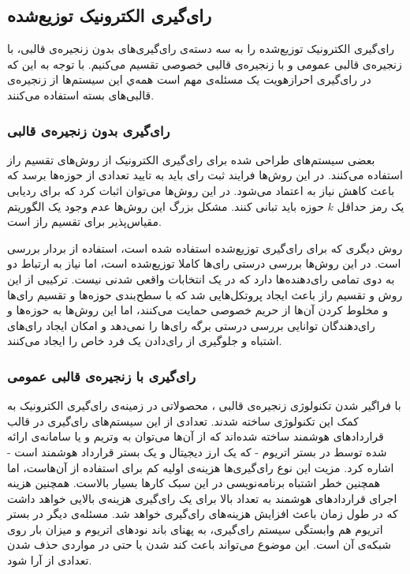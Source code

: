 \subsection{رای‌گیری الکترونیک توزیع‌شده}
رای‌گیری الکترونیک توزیع‌شده را به سه دسته‌ی رای‌گیری‌های بدون زنجیره‌ی قالبی، با زنجیره‌ی قالبی عمومی و با زنجیره‌ی قالبی خصوصی تقسیم می‌کنیم. با توجه به این که در رای‌گیری احرازهویت یک مسئله‌ی مهم است همه‌ي این سیستم‌ها از زنجیره‌ی قالبی‌های بسته استفاده می‌کنند.
\subsubsection{رای‌گیری بدون زنجیره‌ی قالبی} 
بعضی سیستم‌های طراحی شده برای رای‌گیری الکترونیک
\cite{secret1}
\cite{secret2}
\cite{secret3}
از روش‌های تقسیم راز
استفاده می‌کنند. در این روش‌ها فرایند ثبت رای باید به تایید تعدادی از حوزه‌ها برسد که باعث کاهش نیاز به اعتماد می‌شود. در این روش‌ها می‌توان اثبات کرد که برای ردیابی یک رمز حداقل $k$ حوزه باید تبانی کنند. مشکل بزرگ این روش‌ها عدم وجود یک الگوریتم مقیاس‌پذیر برای تقسیم راز است.
\par
روش دیگری که برای رای‌گیری توزیع‌شده استفاده شده است، استفاده از بردار‌ بررسی
\cite{checkvector}
است. در این روش‌ها بررسی درستی رای‌ها کاملا توزیع‌شده‌ است، اما نیاز به ارتباط دو به دوی تمامی رای‌دهنده‌ها دارد که در یک انتخابات واقعی شدنی نیست. ترکیبی از این روش و تقسیم راز باعث ایجاد پروتکل‌هایی
\cite{MPO1} \cite{evotinwocrypto}
شد که با سطح‌بندی حوزه‌ها و تقسیم رای‌ها و مخلوط کردن آن‌ها از حریم خصوصی حمایت می‌کنند، اما این روش‌ها به حوزه‌ها و رای‌دهندگان توانایی بررسی درستی برگه رای‌ها را نمی‌دهد و امکان ایجاد رای‌های اشتباه و جلوگیری از رای‌دادن یک فرد خاص را ایجاد می‌کنند. 


\subsubsection{رای‌گیری با زنجیره‌ی قالبی عمومی}
با فراگیر شدن تکنولوژی زنجیره‌ی قالبی
\cite{rosgood}
، محصولاتی در زمینه‌ی رای‌گیری الکترونیک به کمک این تکنولوژی ساخته شدند. تعدادی از این سیستم‌های رای‌گیری در قالب قرارداد‌های هوشمند
\cite{SmartContract}
ساخته‌ شده‌اند که از آن‌ها می‌توان به وتریم 
\cite{votereum}
و یا سامانه‌ی ارائه شده توسط
\cite{yavuz}
در بستر اتریوم
\cite{Ethereum}
- که یک ارز دیجیتال و یک بستر قرارداد هوشمند است - 
اشاره کرد. مزیت این نوع رای‌گیری‌ها هزینه‌ی اولیه کم برای استفاده از آن‌هاست، اما همچنین خطر اشتباه برنامه‌نویسی
\cite{surveyAtt}
\cite{gyges} \cite{smart}
در این سبک کارها بسیار بالاست. همچنین هزینه اجرای قراردادهای هوشمند به تعداد بالا برای یک رای‌گیری هزینه‌ی بالایی خواهد داشت که در طول زمان باعث افزایش هزینه‌های رای‌گیری خواهد شد. مسئله‌ی دیگر در بستر اتریوم هم وابستگی سیستم رای‌گیری، به پهنای باند نود‌های اتریوم و میزان بار روی شبکه‌ی آن است. این موضوع می‌تواند باعث کند شدن یا حتی در مواردی حذف شدن تعدادی از آرا شود.

